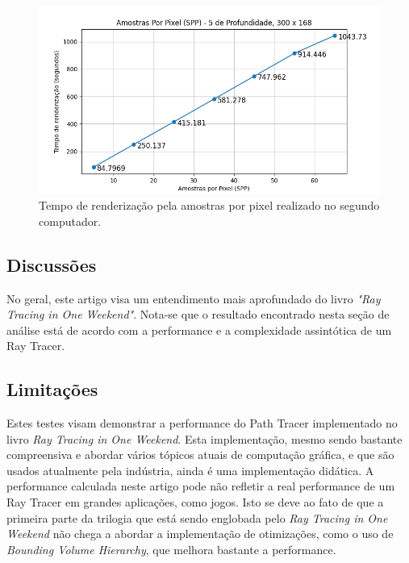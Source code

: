 \documentclass[journal]{IEEEtran}
\begin{document}
\begin{figure}[ht]
  \centering
  \includegraphics[width=\linewidth]{media/Notebook_SPP.png}
  \caption{Tempo de renderização pela amostras por pixel realizado no segundo computador.}
  \label{img_notebook_spp}
\end{figure}

\subsection*{Discussões}
No geral, este artigo visa um entendimento mais aprofundado do livro \emph{"Ray Tracing in One Weekend"}.
Nota-se que o resultado encontrado nesta seção de análise está de acordo com a performance e a complexidade
assintótica de um Ray Tracer. 

\subsection*{Limitações}
Estes testes visam demonstrar a performance do Path Tracer implementado no livro \emph{Ray Tracing in One Weekend}.
Esta implementação, mesmo sendo bastante compreensiva e abordar vários tópicos atuais de computação gráfica, e que
são usados atualmente pela indústria, ainda é uma implementação didática. A performance calculada neste artigo
pode não refletir a real performance de um Ray Tracer em grandes aplicações, como jogos. Isto se deve ao fato de que
a primeira parte da trilogia que está sendo englobada pelo \emph{Ray Tracing in One Weekend} não chega a abordar
a implementação de otimizações, como o uso de \emph{Bounding Volume Hierarchy}, que melhora bastante a performance.
\end{document}
